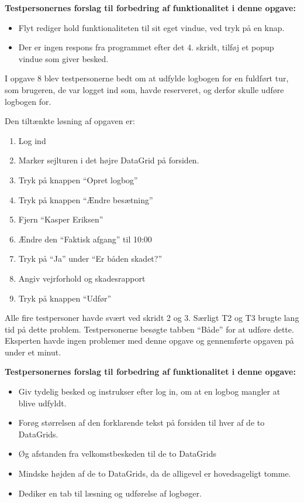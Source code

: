 \textbf{Testpersonernes forslag til forbedring af funktionalitet i denne opgave:}
\begin{itemize}
    \item Flyt rediger hold funktionaliteten til sit eget vindue, ved tryk på en knap.
    \item Der er ingen respons fra programmet efter det 4. skridt, tilføj et popup vindue som giver besked.
\end{itemize}


I opgave 8 blev testpersonerne bedt om at udfylde logbogen for en fuldført tur, som brugeren, de var logget ind som, havde reserveret, og derfor skulle udføre logbogen for.

Den tiltænkte løsning af opgaven er:
\begin{enumerate}
    \item Log ind
    \item Marker sejlturen i det højre DataGrid på forsiden.
    \item Tryk på knappen ``Opret logbog''
    \item Tryk på knappen ``Ændre besætning''
    \item Fjern ``Kasper Eriksen''
    \item Ændre den ``Faktisk afgang'' til 10:00
    \item Tryk på ``Ja'' under ``Er båden skadet?''
    \item Angiv vejrforhold og skadesrapport
    \item Tryk på knappen ``Udfør''
\end{enumerate}

Alle fire testpersoner havde svært ved skridt 2 og 3.
Særligt T2 og T3 brugte lang tid på dette problem.
Testpersonerne besøgte tabben ``Både'' for at udføre dette. 
Eksperten havde ingen problemer med denne opgave og gennemførte opgaven på under et minut.

\textbf{Testpersonernes forslag til forbedring af funktionalitet i denne opgave:}
\begin{itemize}
    \item Giv tydelig besked og instrukser efter log in, om at en logbog mangler at blive udfyldt.
    \item Forøg størrelsen af den forklarende tekst på forsiden til hver af de to DataGrids.
    \item Øg afstanden fra velkomstbeskeden til de to DataGrids
    \item Mindske højden af de to DataGrids, da de alligevel er hovedsageligt tomme. 
    \item Dediker en tab til læsning og udførelse af logbøger. 
\end{itemize}

